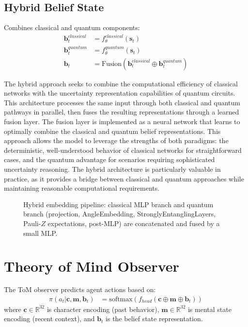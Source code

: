 \documentclass[11pt]{article}
\begin{document}
\subsection{Hybrid Belief State}
Combines classical and quantum components:
\begin{align}
    \mathbf{b}_t^{classical} &= f_{\theta}^{classical}(\mathbf{s}_t) \\
    \mathbf{b}_t^{quantum} &= f_{\theta}^{quantum}(\mathbf{s}_t) \\
    \mathbf{b}_t &= \text{Fusion}(\mathbf{b}_t^{classical} \oplus \mathbf{b}_t^{quantum})
\end{align}

The hybrid approach seeks to combine the computational efficiency of classical networks with the uncertainty representation capabilities of quantum circuits. This architecture processes the same input through both classical and quantum pathways in parallel, then fuses the resulting representations through a learned fusion layer. The fusion layer is implemented as a neural network that learns to optimally combine the classical and quantum belief representations. This approach allows the model to leverage the strengths of both paradigms: the deterministic, well-understood behavior of classical networks for straightforward cases, and the quantum advantage for scenarios requiring sophisticated uncertainty reasoning. The hybrid architecture is particularly valuable in practice, as it provides a bridge between classical and quantum approaches while maintaining reasonable computational requirements.

\begin{figure}[t]
\centering

\caption{Hybrid embedding pipeline: classical MLP branch and quantum branch (projection, AngleEmbedding, StronglyEntanglingLayers, Pauli-$Z$ expectations, post-MLP) are concatenated and fused by a small MLP.}
\label{fig:hybrid-embedding}
\end{figure}

\section{Theory of Mind Observer}

The ToM observer predicts agent actions based on:
\begin{align}
    \pi(a_t | \mathbf{c}, \mathbf{m}, \mathbf{b}_t) &= \text{softmax}(f_{head}(\mathbf{c} \oplus \mathbf{m} \oplus \mathbf{b}_t))
\end{align}
where $\mathbf{c} \in \mathbb{R}^{32}$ is character encoding (past behavior), $\mathbf{m} \in \mathbb{R}^{32}$ is mental state encoding (recent context), and $\mathbf{b}_t$ is the belief state representation.
\end{document}
